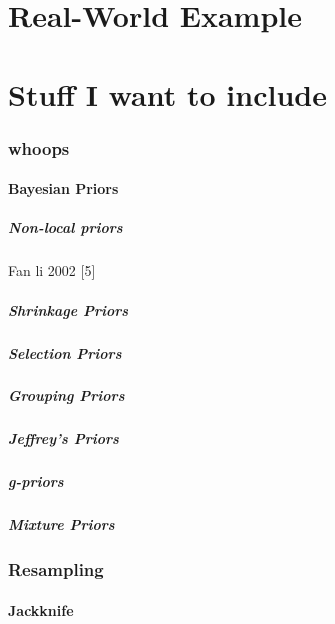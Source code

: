 \iffalse

\part{Real-World Example}

\part{Stuff I want to include}

\section{whoops}
\subsection{Bayesian Priors}
\subsubsection{Non-local priors}
Fan li 2002 [5]
\subsubsection{Shrinkage Priors}
\subsubsection{Selection Priors}
\subsubsection{Grouping Priors}
\subsubsection{Jeffrey's Priors}
\subsubsection{g-priors}
\subsubsection{Mixture Priors}

\section{Resampling}
\subsection{Jackknife}
